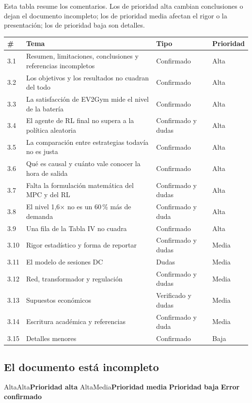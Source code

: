 \documentclass[11pt]{article}
\newcommand{\prioridad}[1]{%
  \def\tmpA{Alta}\def\tmpM{Media}\def\tmp{#1}%
  \ifx\tmp\tmpA\colorbox{rojoerror}{\color{white}\small\bfseries Prioridad alta}%
  \else\ifx\tmp\tmpM\colorbox{naranjatarea}{\color{white}\small\bfseries Prioridad media}%
  \else\colorbox{azulidea}{\color{white}\small\bfseries Prioridad baja}\fi\fi}
\newcommand{\confirmado}{\colorbox{rojoerror!15}{\small\bfseries\color{rojoerror} Error confirmado}}
\begin{document}
Esta tabla resume los comentarios. Los de prioridad alta cambian conclusiones o dejan el documento incompleto; los de prioridad media afectan el rigor o la presentación; los de prioridad baja son detalles.

\begin{center}
\footnotesize
\renewcommand{\arraystretch}{0.95}
\begin{tabularx}{\textwidth}{@{}lXll@{}}
\toprule
\# & Tema & Tipo & Prioridad \\
\midrule
3.1 & Resumen, limitaciones, conclusiones y referencias incompletos & Confirmado & Alta \\
3.2 & Los objetivos y los resultados no cuadran del todo & Confirmado & Alta \\
3.3 & La satisfacción de EV2Gym mide el nivel de la batería & Confirmado & Alta \\
3.4 & El agente de RL final no supera a la política aleatoria & Confirmado y dudas & Alta \\
3.5 & La comparación entre estrategias todavía no es justa & Confirmado & Alta \\
3.6 & Qué es causal y cuánto vale conocer la hora de salida & Confirmado & Alta \\
3.7 & Falta la formulación matemática del MPC y del RL & Confirmado y dudas & Alta \\
3.8 & El nivel 1,6× no es un 60\,\% más de demanda & Confirmado y duda & Alta \\
3.9 & Una fila de la Tabla IV no cuadra & Confirmado & Alta \\
3.10 & Rigor estadístico y forma de reportar & Confirmado y dudas & Media \\
3.11 & El modelo de sesiones DC & Dudas & Media \\
3.12 & Red, transformador y regulación & Confirmado y dudas & Media \\
3.13 & Supuestos económicos & Verificado y dudas & Media \\
3.14 & Escritura académica y referencias & Confirmado y duda & Media \\
3.15 & Detalles menores & Confirmado & Baja \\
\bottomrule
\end{tabularx}
\end{center}

\subsection{El documento está incompleto}
\prioridad{Alta} \confirmado
\end{document}
